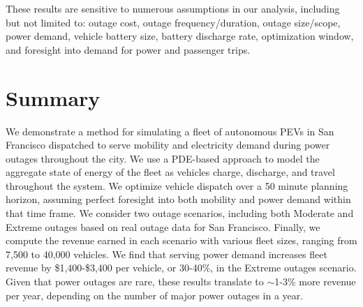 \documentclass[journal]{IEEEtran}
\begin{document}
These results are sensitive to numerous assumptions in our analysis, including but not limited to: outage cost, outage frequency/duration, outage size/scope, power demand, vehicle battery size, battery discharge rate, optimization window, and foresight into demand for power and passenger trips.

\section{Summary}
We demonstrate a method for simulating a fleet of autonomous PEVs in San Francisco dispatched to serve mobility and electricity demand during power outages throughout the city. We use a PDE-based approach to model the aggregate state of energy of the fleet as vehicles charge, discharge, and travel throughout the system. We optimize vehicle dispatch over a 50 minute planning horizon, assuming perfect foresight into both mobility and power demand within that time frame. We consider two outage scenarios, including both Moderate and Extreme outages based on real outage data for San Francisco. Finally, we compute the revenue earned in each scenario with various fleet sizes, ranging from 7,500 to 40,000 vehicles. We find that serving power demand increases fleet revenue by \$1,400-\$3,400 per vehicle, or 30-40\%, in the Extreme outages scenario. Given that power outages are rare, these results translate to $\sim$1-3\% more revenue per year, depending on the number of major power outages in a year.




\end{document}
